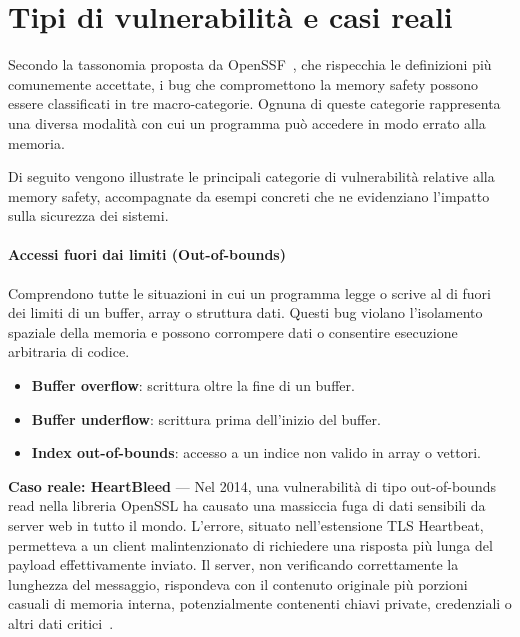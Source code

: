 \section{Tipi di vulnerabilità e casi reali}
\label{sec:vulnerability_types}

Secondo la tassonomia proposta da OpenSSF~\cite{memory_safety_continuum_definition},
che rispecchia le definizioni più comunemente accettate, i bug che compromettono
la memory safety possono essere classificati in tre macro-categorie. Ognuna di
queste categorie rappresenta una diversa modalità con cui un programma può
accedere in modo errato alla memoria.

Di seguito vengono illustrate le principali categorie di vulnerabilità relative
alla memory safety, accompagnate da esempi concreti che ne evidenziano l'impatto
sulla sicurezza dei sistemi.

\paragraph{Accessi fuori dai limiti (Out-of-bounds)}
\label{sec:oob}

Comprendono tutte le situazioni in cui un programma legge o scrive al di fuori dei
limiti di un buffer, array o struttura dati. Questi bug violano l'isolamento spaziale
della memoria e possono corrompere dati o consentire esecuzione arbitraria di codice.

\begin{itemize}
  \item \textbf{Buffer overflow}: scrittura oltre la fine di un buffer.

  \item \textbf{Buffer underflow}: scrittura prima dell'inizio del buffer.

  \item \textbf{Index out-of-bounds}: accesso a un indice non valido in array o vettori.
\end{itemize}

\textbf{Caso reale: HeartBleed} — Nel 2014, una vulnerabilità di tipo out-of-bounds
read nella libreria OpenSSL ha causato una massiccia fuga di dati sensibili da
server web in tutto il mondo. L'errore, situato nell'estensione TLS Heartbeat, permetteva
a un client malintenzionato di richiedere una risposta più lunga del payload effettivamente
inviato. Il server, non verificando correttamente la lunghezza del messaggio,
rispondeva con il contenuto originale più porzioni casuali di memoria interna, potenzialmente
contenenti chiavi private, credenziali o altri dati critici~\cite{heartbleed}.


